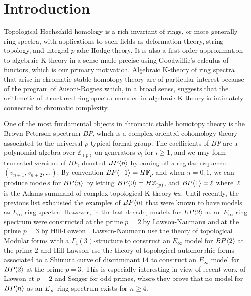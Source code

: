 
\section{Introduction}
Topological Hochschild homology is a rich invariant of rings, or more generally ring spectra, with applications to such fields as deformation theory, string topology, and integral $p$-adic Hodge theory. It is also a first order approximation to algebraic K-theory in a sense made precise using Goodwillie's calculus of functors, which is our primary motivation. Algebraic K-theory of ring spectra that arise in chromatic stable homotopy theory are of particular interest because of the program of Ausoni-Rognes \cite{AR02} which, in a broad sense, suggests that the arithmetic of structured ring spectra encoded in algebraic K-theory is intimately connected to chromatic complexity. 

One of the most fundamental objects in chromatic stable homotopy theory is the Brown-Peterson spectrum $BP$, which is a complex oriented cohomology theory associated to the universal $p$-typical formal group. The coefficients of $BP$ are a polynomial algebra over $\mathbb{Z}_{(p)}$ on generators $v_i$ for $i\ge 1$, and we may form truncated versions of $BP$, denoted $BP\langle n \rangle$ by coning off a regular sequence $(v_{n+1},v_{n+2}, \ldots )$. 
By convention $BP\langle -1 \rangle=H\mathbb{F}_p$ and when $n=0,1$, we can produce models for $BP\langle n \rangle$ by letting $BP\langle 0 \rangle=H\mathbb{Z}_{(p)}$, and $BP\langle 1 \rangle=\ell$ where $\ell$ is the Adams summand of complex topological K-theory $ku$. Until recently, the previous list exhausted the examples of $BP\langle n \rangle$ that were known to have models as $E_{\infty}$-ring spectra. However, in the last decade, models for $BP\langle 2 \rangle$ as an $E_{\infty}$-ring spectrum were constructed at the prime $p=2$ by Lawson-Naumann \cite{LawsonNaumann} and at the prime $p=3$ by Hill-Lawson \cite{HillLawson}. Lawson-Naumann \cite{LawsonNaumann} use the theory of topological Modular forms with a $\Gamma_1(3)$-structure to construct an $E_{\infty}$ model for $BP\langle 2 \rangle$ at the prime $2$ and Hill-Lawson \cite{HillLawson} use the theory of topological automorphic forms associated to a Shimura curve of discriminant $14$ to construct an $E_{\infty}$ model for $BP\langle 2 \rangle$ at the prime $p=3$. This is especially interesting in view of recent work of Lawson \cite{Law18} at $p=2$ and Senger \cite{Sen17} for odd primes, where they prove that no model for $BP\langle n \rangle$ as an $E_{\infty}$-ring spectrum exists for $n\ge 4$. %

